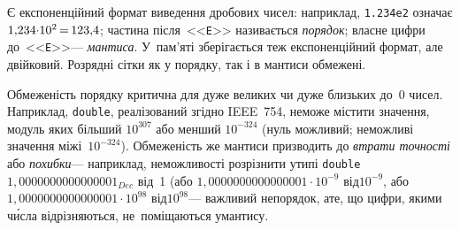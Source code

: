 


\label{sec:floating-point}
Є експоненційний формат виведення дробових чисел: наприклад, \texttt{1.234e2} означає ${1{,}234{\cdot}10^2}\dib{{=}}123{,}4$; частина після~<<\texttt{E}>> називається \emph{порядок}; власне цифри до~<<\texttt{E}>>\nolinebreak[3] --- \emph{мантиса}. У~пам'яті зберігається теж експоненційний формат, але двійковий. Розрядні сітки як у порядку, так і в мантиси обмежені.

Обмеженість порядку критична для дуже великих чи дуже близьких до~0 чисел. Наприклад,  \texttt{double}, реалізований згідно IEEE~754, не\nolinebreak[3] може містити значення, модуль яких більший $10^{307}$ або менший $10^{-324}$ (нуль можливий; немож\-ливі значення між\nolinebreak[1] і~$10^{-324}$).
Обмеженість же мантиси призводить до \emph{втрати точності} або \emph{похибки}\nolinebreak[3] --- наприклад, неможливості розрізнити у\nolinebreak[2] типі \texttt{double} $1{,}0000000000000001_{Dec}$ від~1 (або $1{,}0000000000000001{\cdot}10^{-9}$ від\nolinebreak[2] $10^{-9}$, або $1{,}0000000000000001{\cdot}10^{98}$ від\nolinebreak[2] $10^{98}$\nolinebreak[3] --- важливий не\nolinebreak[3] порядок, 
а\nolinebreak[3] те, що цифри, якими ч\'{и}сла відрізняються, не~поміщаються у\nolinebreak[3] мантису.

